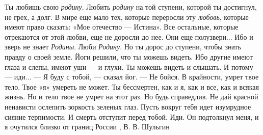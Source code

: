 Ты любишь свою \emph{родину}. Любить \emph{родину} на той ступени, которой ты достигнул, не
грех, а долг. В мире еще мало тех, которые переросли эту \emph{любовь}, которые имеют
право сказать: «Мое отечество — Истина». Все остальные, которые отрекаются от
этой любви, еще не доросли до нее. Они еще полузвери... Ибо и зверь не знает
\emph{Родины}. Люби \emph{Родину}.  Но ты дорос до ступени, чтобы знать правду о своей земле.
Йоги решили, что ты можешь видеть. Ибо другие имеют глаза и слепы, имеют уши —
и глухи. Ты можешь видеть и слышать. И потому — иди...  — Я буду с тобой, —
сказал йог. —   Не бойся. В крайности, умрет твое тело. Твое «я» умереть не
может. Ты бессмертен, как и я, как и все, как и всякая жизнь. Но и тело твое не
умрет на этот раз. Но будь справедлив. Не дай красной ненависти ослепить
зоркость зеленых глаз. Пусть вокруг тебя идет изумрудное сияние терпимости. И
смерть отступит перед тобой. Иди.  Он подтолкнул меня, и я очутился близко от
границ России
, В. В. Шульгин
